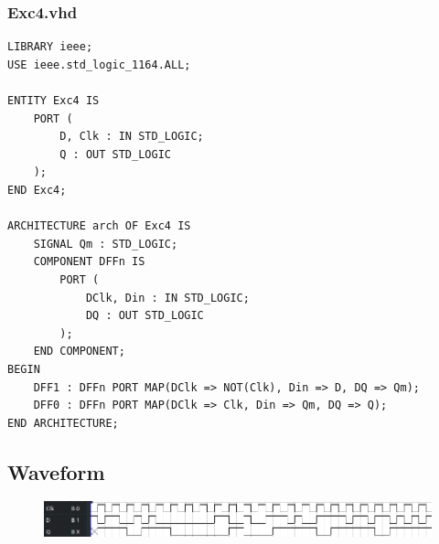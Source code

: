 \documentclass[13pt,a4paper]{report}
\begin{document}
\subsubsection{Exc4.vhd}
\begin{verbatim}
LIBRARY ieee;
USE ieee.std_logic_1164.ALL;

ENTITY Exc4 IS
	PORT (
		D, Clk : IN STD_LOGIC;
		Q : OUT STD_LOGIC
	);
END Exc4;

ARCHITECTURE arch OF Exc4 IS
	SIGNAL Qm : STD_LOGIC;
	COMPONENT DFFn IS
		PORT (
			DClk, Din : IN STD_LOGIC;
			DQ : OUT STD_LOGIC
		);
	END COMPONENT;
BEGIN
	DFF1 : DFFn PORT MAP(DClk => NOT(Clk), Din => D, DQ => Qm);
	DFF0 : DFFn PORT MAP(DClk => Clk, Din => Qm, DQ => Q);
END ARCHITECTURE;
\end{verbatim}

\subsection{Waveform}
\begin{figure}[H]
\centering
\includegraphics[scale=0.7]{images/Exc4_waveform.png}
\end{figure}
\end{document}
